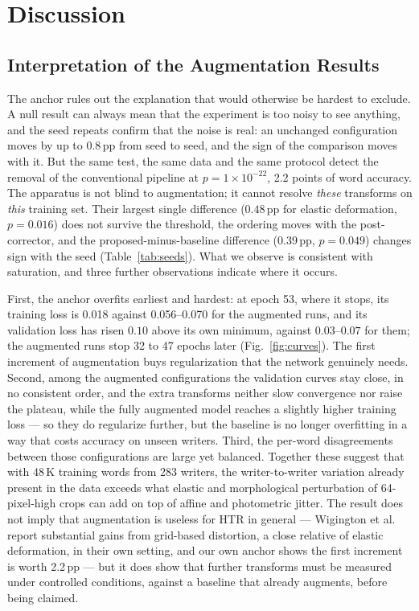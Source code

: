 \documentclass{ws-ijprai}
\newcommand{\deltawa}{0.39\,pp}        %
\begin{document}
\section{Discussion}
\label{sec:discussion}

\subsection{Interpretation of the Augmentation Results}

The anchor rules out the explanation that would otherwise be hardest
to exclude. A null result can always mean that the experiment is too
noisy to see anything, and the seed repeats confirm that the noise is
real: an unchanged configuration moves by up to 0.8\,pp from seed to
seed, and the sign of the comparison moves with it. But the same test, the same data and the same protocol detect the
removal of the conventional pipeline at $p=1\times10^{-22}$, 2.2
points of word accuracy. The apparatus is not blind to augmentation; it
cannot resolve \emph{these} transforms on \emph{this} training set. Their
largest single difference ($0.48$\,pp for elastic deformation, $p=0.016$)
does not survive the threshold, the ordering moves with the
post-corrector, and the proposed-minus-baseline difference (\deltawa,
$p=0.049$) changes sign with the seed (Table~\ref{tab:seeds}). What we observe is consistent with
saturation, and three further observations indicate where it occurs.

First, the anchor overfits earliest and hardest: at epoch 53, where it
stops, its training loss is 0.018 against 0.056--0.070 for the
augmented runs, and its validation loss has risen $0.10$ above its own
minimum, against $0.03$--$0.07$ for them; the augmented runs stop 32 to
47 epochs later (Fig.~\ref{fig:curves}). The first increment of
augmentation buys regularization that the network genuinely needs. Second, among the
augmented configurations the validation curves stay close, in no consistent
order, and the extra transforms neither slow convergence nor raise the
plateau, while the
fully augmented model reaches a slightly higher training loss --- so
they do regularize further, but the baseline is no longer overfitting
in a way that costs accuracy on unseen writers. Third, the per-word
disagreements between those configurations are large yet balanced.
Together these suggest that with 48\,K training words from 283
writers, the writer-to-writer variation already present in the data
exceeds what elastic and morphological perturbation of 64-pixel-high
crops can add on top of affine and photometric jitter. The result does
not imply that augmentation is useless for HTR in general --- Wigington et
al.~\cite{wigington2017data} report substantial gains from grid-based
distortion, a close relative of elastic deformation, in their own setting,
and our own anchor shows the first increment is worth 2.2\,pp --- but it
does show that further transforms must be measured under controlled
conditions, against a baseline that already augments, before being
claimed.
\end{document}
